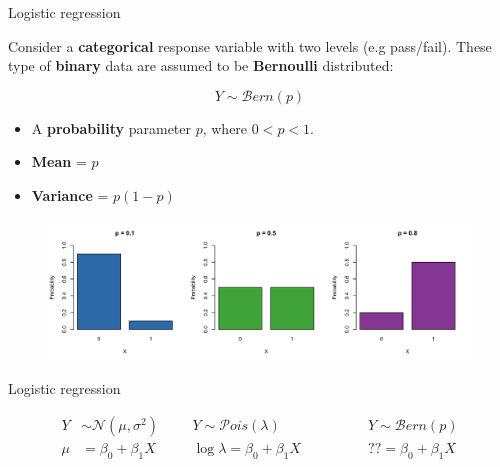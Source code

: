 \documentclass[pdf,handout]{beamer}
\begin{document}
\begin{frame}{Logistic regression}

Consider a \textbf{categorical} response variable with two levels (e.g pass/fail). 
These type of \textbf{binary} data are assumed to be \textbf{Bernoulli} distributed:

$$
Y \sim \mathcal{B}ern(p)
$$

\begin{itemize}\addtolength{\itemsep}{.25\baselineskip}
    \item A \textbf{probability} parameter $p$, where $0 < p < 1$.
    \item \textbf{Mean} = $p$  
    \item \textbf{Variance} = $p(1 - p)$
\end{itemize}

\begin{figure}
\includegraphics[width=.9\textwidth]{berndist.png}
\end{figure}

\end{frame}

\begin{frame}{Logistic regression}

$$
\begin{aligned}
Y & \sim \mathcal{N}(\mu, \sigma^2) &&& Y  \sim \mathcal{P}ois(\lambda) &&&&&& Y  \sim \mathcal{B}ern(p)\\
\mu & = \beta_0 + \beta_1X &&& \log{\lambda} = \beta_0 + \beta_1X &&&&&& ?? = \beta_0 + \beta_1X
\end{aligned}
$$

\vfill


\end{frame}
\end{document}
